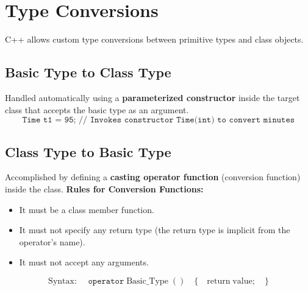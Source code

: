 \documentclass[12pt,a4paper]{article}
\begin{document}
\section{Type Conversions}

C++ allows custom type conversions between primitive types and class objects.

\subsection{Basic Type to Class Type}
Handled automatically using a \textbf{parameterized constructor} inside the target class that accepts the basic type as an argument.
\begin{equation}
  \texttt{Time t1 = 95; // Invokes constructor Time(int) to convert minutes}
\end{equation}

\subsection{Class Type to Basic Type}
Accomplished by defining a \textbf{casting operator function} (conversion function) inside the class.
\textbf{Rules for Conversion Functions:}
\begin{itemize}[leftmargin=*, itemsep=2pt]
  \item It must be a class member function.
  \item It must not specify any return type (the return type is implicit from the operator's name).
  \item It must not accept any arguments.
\end{itemize}
\begin{equation}
  \text{Syntax: } \quad \texttt{operator}\;\text{Basic\_Type}\;() \quad \{ \quad \text{return}\;\text{value}; \quad \}
\end{equation}
\end{document}
